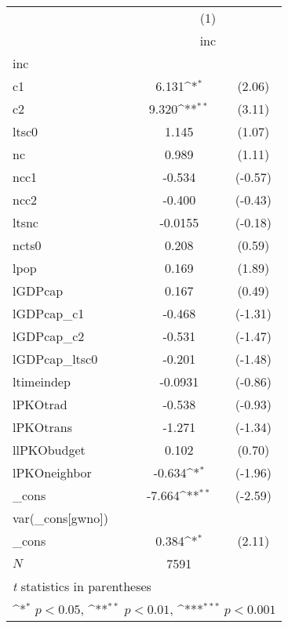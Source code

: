 {
\def\sym#1{\ifmmode^{#1}\else\(^{#1}\)\fi}
\begin{tabular}{l*{1}{cc}}
\hline\hline
            &\multicolumn{2}{c}{(1)}           \\
            &\multicolumn{2}{c}{inc}           \\
\hline
inc         &                     &            \\
c1          &       6.131\sym{*}  &      (2.06)\\
c2          &       9.320\sym{**} &      (3.11)\\
ltsc0       &       1.145         &      (1.07)\\
nc          &       0.989         &      (1.11)\\
ncc1        &      -0.534         &     (-0.57)\\
ncc2        &      -0.400         &     (-0.43)\\
ltsnc       &     -0.0155         &     (-0.18)\\
ncts0       &       0.208         &      (0.59)\\
lpop        &       0.169         &      (1.89)\\
lGDPcap     &       0.167         &      (0.49)\\
lGDPcap\_c1  &      -0.468         &     (-1.31)\\
lGDPcap\_c2  &      -0.531         &     (-1.47)\\
lGDPcap\_ltsc0&      -0.201         &     (-1.48)\\
ltimeindep  &     -0.0931         &     (-0.86)\\
lPKOtrad    &      -0.538         &     (-0.93)\\
lPKOtrans   &      -1.271         &     (-1.34)\\
llPKObudget &       0.102         &      (0.70)\\
lPKOneighbor&      -0.634\sym{*}  &     (-1.96)\\
\_cons      &      -7.664\sym{**} &     (-2.59)\\
\hline
var(\_cons[gwno])&                     &            \\
\_cons      &       0.384\sym{*}  &      (2.11)\\
\hline
\(N\)       &        7591         &            \\
\hline\hline
\multicolumn{3}{l}{\footnotesize \textit{t} statistics in parentheses}\\
\multicolumn{3}{l}{\footnotesize \sym{*} \(p<0.05\), \sym{**} \(p<0.01\), \sym{***} \(p<0.001\)}\\
\end{tabular}
}
